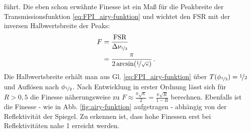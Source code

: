 führt. Die eben schon erwähnte Finesse ist ein Maß für die Peakbreite der
Transmissionsfunktion \eqref{eq:FPI_airy-funktion} und wichtet den FSR mit der
inversen Halbwertsbreite der Peaks:
\begin{equation}\label{eq:FPI_finesse}
	\begin{split}
		F&=\frac{\text{FSR}}{\Delta\nu_{\nicefrac{1}{2}}}\\
		&=\frac{\pi}{2\arcsin(\nicefrac{1}{\sqrt{\kappa}})}\,.
	\end{split}
\end{equation}
Die Halbwertsbreite erhält man aus Gl. \eqref{eq:FPI_airy-funktion} über
$T(\phi_{\nicefrac{1}{2}})=\nicefrac{1}{2}$ und Auflösen nach
$\phi_{\nicefrac{1}{2}}$. Nach Entwicklung in erster Ordnung lässt sich für
$R>0,5$ die Finesse näherungsweise zu
$F\approx\frac{\pi\sqrt{\kappa}}{2}=\frac{\pi\sqrt{R}}{1-R}$ berechnen.
Ebenfalls ist die Finesse - wie in Abb. \ref{fig:airy-funktion} aufgetragen - abhängig von der Reflektivität der Spiegel. Zu erkennen ist, dass hohe Finessen erst bei Reflektivitäten nahe 1 erreicht werden.

